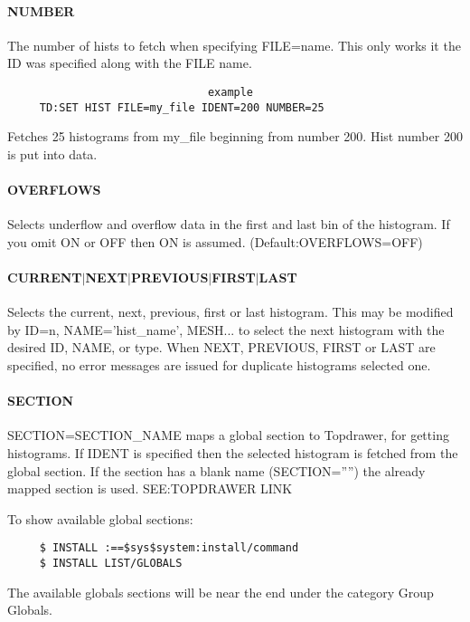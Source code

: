 \paragraph{NUMBER}
The  number  of  hists to fetch when specifying FILE=name.  This only
works it the ID was specified along with the FILE name.  

\begin{verbatim}
                               example
     TD:SET HIST FILE=my_file IDENT=200 NUMBER=25 
\end{verbatim}
Fetches  25  histograms from my\_file beginning from number 200.  Hist
number 200 is put into data.  
\paragraph{OVERFLOWS}
Selects  underflow and overflow data in the first and last bin of the
histogram.   If  you  omit  ON   or   OFF   then   ON   is   assumed.
(Default:OVERFLOWS=OFF) 
\paragraph{CURRENT$|$NEXT$|$PREVIOUS$|$FIRST$|$LAST}
Selects  the  current, next, previous, first or last histogram.  This
may be modified by ID=n, NAME='hist\_name',  MESH...   to  select  the
next  histogram  with  the  desired  ID,  NAME,  or type.  When NEXT,
PREVIOUS, FIRST or LAST are specified, no error messages  are  issued
for duplicate histograms selected one.  
\paragraph{SECTION}
SECTION=SECTION\_NAME  maps a global section to Topdrawer, for getting
histograms.  If IDENT is specified then  the  selected  histogram  is
fetched  from  the  global  section.  If the section has a blank name
(SECTION='''') the already mapped section is used.  SEE:TOPDRAWER LINK 

To show available global sections:  
\begin{verbatim}
     $ INSTALL :==$sys$system:install/command 
     $ INSTALL LIST/GLOBALS 
\end{verbatim}
The  available  globals  sections  will  be  near  the  end under the
category Group Globals.  
